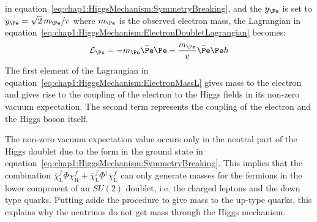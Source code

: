 in equation~\ref{eq:chap1:HiggsMechanism:SymmetryBreaking}, and the 
$y_{\Pe}$ is set to $y_{\Pe}=\sqrt{2}\,m_{\Pe}/v$ where $m_{\Pe}$ is the observed 
electron mass, 
 the Lagrangian in equation~\ref{eq:chap1:HiggsMechanism:ElectronDoubletLagrangian} becomes:
\begin{equation}\label{eq:chap1:HiggsMechanism:ElectronMassL}
\mathcal{L}_{\Pe} = -m_{\Pe} \bar{\Pe}\Pe - \frac{m_{\Pe}}{v}\bar{\Pe}\Pe h
\end{equation}
The first element of the Lagrangian in equation~\ref{eq:chap1:HiggsMechanism:ElectronMassL} gives mass to the electron and gives rise to the coupling of the electron to the Higgs fields in its non-zero vacuum expectation. 
The second term represents the coupling of the electron and the Higgs boson itself.

The non-zero vacuum expectation value occurs only in the neutral part of the Higgs doublet due to the form 
in the ground state in equation~\ref{eq:chap1:HiggsMechanism:SymmetryBreaking}. This implies that the combination $\bar{\chi}_{\text{L}}^f \Phi \chi_\text{R}^{f} + \bar{\chi}_{\text{L}}^f \Phi^{\dagger} \chi_\text{L}^{f}$ can only generate
masses for the fermions in the lower component of an $SU(2)$ doublet, i.e. the charged leptons and the down type quarks. Putting aside the procedure to give mass to the up-type quarks,
this explains why the neutrinos do not get mass through the Higgs mechanism.


